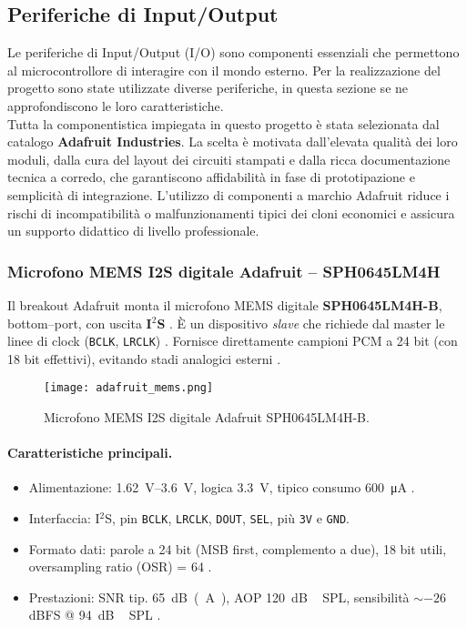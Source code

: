 \subsection{Periferiche di Input/Output}
Le periferiche di Input/Output (I/O) sono componenti essenziali che permettono al microcontrollore di interagire con il mondo esterno.
Per la realizzazione del progetto sono state utilizzate diverse periferiche, in questa sezione se ne approfondiscono le loro caratteristiche.\\
\noindent
Tutta la componentistica impiegata in questo progetto è stata selezionata dal catalogo \textbf{Adafruit Industries}. 
La scelta è motivata dall'elevata qualità dei loro moduli, dalla cura del layout dei circuiti stampati e dalla ricca documentazione tecnica a corredo, che 
garantiscono affidabilità in fase di prototipazione e semplicità di integrazione. 
L'utilizzo di componenti a marchio Adafruit riduce i rischi di incompatibilità o malfunzionamenti tipici dei cloni economici e assicura un supporto didattico 
di livello professionale.


\subsubsection{Microfono MEMS I2S digitale Adafruit -- SPH0645LM4H}
\label{subsec:mic}
Il breakout Adafruit monta il microfono MEMS digitale \textbf{SPH0645LM4H-B}, bottom–port, con uscita \textbf{I$^2$S}
 \citep[p.~1]{adafruit-sph0645-datasheet}. 
È un dispositivo \emph{slave} che richiede dal master le linee di clock (\texttt{BCLK}, \texttt{LRCLK}) \citep{nordic-devzone}. 
Fornisce direttamente campioni PCM a 24 bit (con 18 bit effettivi), evitando stadi analogici esterni \citep[p.~3]{adafruit-sph0645-datasheet}.
\begin{figure}[H]
  \centering
  \texttt{[image: adafruit\_mems.png]}
  \caption{Microfono MEMS I2S digitale Adafruit SPH0645LM4H-B.}
  \label{fig:adafruit_mems}
  \end{figure}

  \newpage
\paragraph{Caratteristiche principali.}
\begin{itemize}
  \item Alimentazione: \SIrange{1.62}{3.6}{V}, logica \SI{3.3}{V}, tipico consumo \SI{600}{\micro A} \citep[p.~2]{adafruit-sph0645-datasheet}.
  \item Interfaccia: I$^2$S, pin \texttt{BCLK}, \texttt{LRCLK}, \texttt{DOUT}, \texttt{SEL}, più \texttt{3V} e \texttt{GND}.
  \item Formato dati: parole a 24 bit (MSB first, complemento a due), 18 bit utili, oversampling ratio (OSR) = 64 \citep[p.~3]{adafruit-sph0645-datasheet}.
  \item Prestazioni: SNR tip. \SI{65}{dB(A)}, AOP \SI{120}{dB\,SPL}, sensibilità $\sim -26$ dBFS @ \SI{94}{dB\,SPL} \citep[p.~2]{adafruit-sph0645-datasheet}.
\end{itemize}

